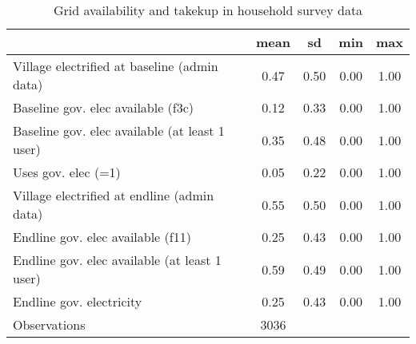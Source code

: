 \begin{table}[htbp]\centering
\def\sym#1{\ifmmode^{#1}\else\(^{#1}\)\fi}
\caption{Grid availability and takekup in household survey data\label {tab1}}
\begin{tabular}{l*{1}{cccc}}
\toprule
                    &        mean&          sd&         min&         max\\
\midrule
Village electrified at baseline (admin data)&        0.47&        0.50&        0.00&        1.00\\
Baseline gov. elec available (f3c)&        0.12&        0.33&        0.00&        1.00\\
Baseline gov. elec available (at least 1 user)&        0.35&        0.48&        0.00&        1.00\\
Uses gov. elec (=1) &        0.05&        0.22&        0.00&        1.00\\
Village electrified at endline (admin data)&        0.55&        0.50&        0.00&        1.00\\
Endline gov. elec available (f11)&        0.25&        0.43&        0.00&        1.00\\
Endline gov. elec available (at least 1 user)&        0.59&        0.49&        0.00&        1.00\\
Endline gov. electricity&        0.25&        0.43&        0.00&        1.00\\
\midrule
Observations        &        3036&            &            &            \\
\bottomrule
\end{tabular}
\end{table}
